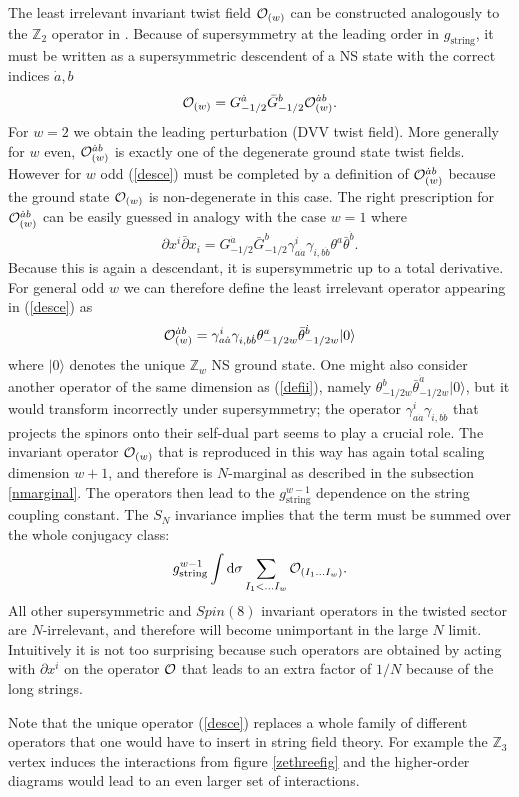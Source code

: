 \documentclass[nohyper,12pt,letterpaper]{JHEP3}
\def\IZ{{\mathbb Z}}           %
\def\calO{{\cal O}}
\def \eqref#1{(\ref{#1})}
\def \eqn#1#2{\begin{equation}#2\label{#1}\end{equation}}
\def \gs{g_{\mathrm{string}}}
\begin{document}
The least irrelevant  invariant twist field $\calO_{(w)}$ can be 
constructed analogously to the $\IZ_2$ operator in \cite{dvv}. 
Because of supersymmetry at the leading order in $\gs$,
it must be 
written as a supersymmetric descendent of a NS state with the
correct indices  $\dot a, b$
%
\eqn{desce}{\calO_{(w)}=G^{\dot a}_{-1/2}
\bar G_{-1/2}^b \calO_{(w)}^{\dot a b}.}
%
For $w=2$ we obtain the leading perturbation (DVV twist field). More 
generally for $w$ even, $\calO_{(w)}^{\dot a b}$ is exactly one of the 
degenerate ground state twist fields. However for $w$ odd \eqref{desce} 
must be completed by a definition of $\calO_{(w)}^{\dot a b}$ because the
ground state $\calO_{(w)}$ is non-degenerate in this case. The right 
prescription for $\calO_{(w)}^{\dot a b}$ can be easily guessed in analogy 
with the case $w=1$ where
%
\eqn{nisone}{\partial x^i\bar\partial x_i
= G_{-1/2}^{\dot a} \bar G_{-1/2}^{b} \gamma^i_{a\dot a}
\gamma_{i,b \dot b}  \theta^a \bar\theta^{\dot b}.}
%
Because this is again a descendant, it is supersymmetric  up to a total 
derivative. For general odd $w$ we can therefore define the least 
irrelevant operator appearing in \eqref{desce} as
%
\eqn{defii}{ \calO_{(w)}^{\dot a b} = 
\gamma^i_{a\dot a}\gamma_{i,b \dot b}
\theta_{-1/2w}^a\bar\theta^{\dot b}_{-1/2w}
|0\rangle}
%
where $|0\rangle$ denotes the unique $\IZ_w$ NS ground state. 
One might also consider another operator of the same dimension as
\eqref{defii}, namely $\theta_{-1/2w}^b\bar\theta^{\dot a}_{-1/2w}
|0\rangle$, but it would transform incorrectly under supersymmetry;
the operator $\gamma^i_{a\dot a}\gamma_{i,b \dot b}$ that projects
the spinors onto their self-dual part seems to play a crucial role.
The invariant operator $\calO_{(w)}$ that is reproduced in this way
has again total scaling dimension $w+1$, and therefore is $N$-marginal
as described in the subsection \ref{nmarginal}. The operators then
lead to the $\gs^{w-1}$ dependence on the string coupling
constant. The $S_N$ invariance implies that the term must be summed
over the whole conjugacy class:
%
\eqn{conjclass}{\gs^{w-1} \int \mathrm{d}\sigma
\sum_{I_1<\dots I_w} \calO_{(I_1\dots I_w)}.}
%
All other supersymmetric and $Spin(8)$ invariant operators in the
twisted sector are $N$-irrelevant, and therefore will become
unimportant in the large $N$ limit. Intuitively it is not too
surprising because such operators are obtained by acting with
$\partial x^i$ on the operator $\calO$ that leads to an extra factor
of $1/N$ because of the long strings.

Note that the unique operator \eqref{desce} replaces a whole family of 
different operators that one would have to insert in string field theory.
For example the $\IZ_3$ vertex induces the interactions from figure
\ref{zethreefig} and the higher-order diagrams would lead to an even 
larger set of interactions.
\end{document}
